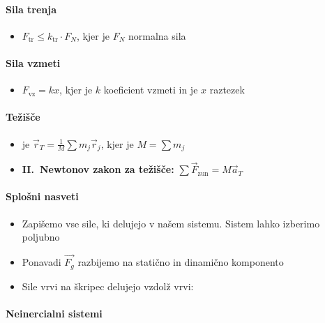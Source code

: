 \paragraph{Sila trenja}
\begin{itemize}
    \item \(F_\text{tr} \leq k_\text{tr} \cdot F_N\), kjer je \(F_N\) normalna sila
\end{itemize}

\paragraph{Sila vzmeti}
\begin{itemize}
    \item \(F_\text{vz} = kx\), kjer je \(k\) koeficient vzmeti in je \(x\) raztezek
\end{itemize}

\paragraph{Težišče}
\begin{itemize}
    \item {} je \(\vec{r}_T = \frac{1}{M} \sum m_j \vec{r}_j\), kjer je \(M = \sum m_j\) 
    \item \textbf{II.\ Newtonov zakon za težišče:} \(\sum \vec{F}_\text{zun} = M \vec{a}_T\)
\end{itemize}

\paragraph{Splošni nasveti}
\begin{itemize}
    \item Zapišemo vse sile, ki delujejo v našem sistemu. Sistem lahko izberimo poljubno
    \item Ponavadi \(\vec{F_g}\) razbijemo na statično in dinamično komponento
    \item Sile vrvi na škripec delujejo vzdolž vrvi:
\end{itemize}

\paragraph{Neinercialni sistemi} \ 

